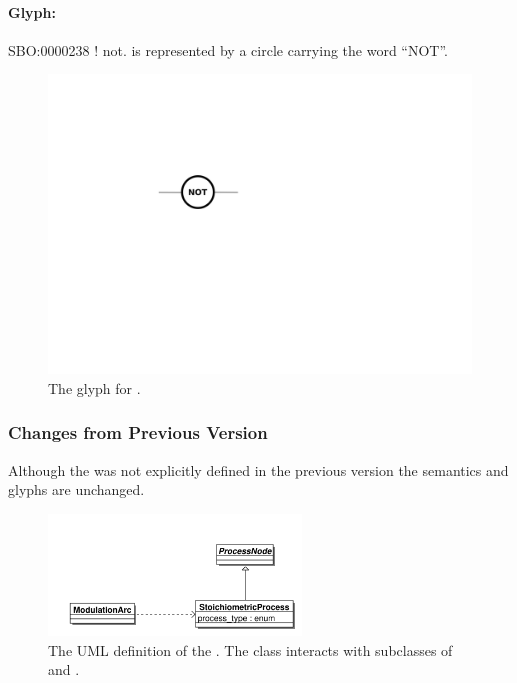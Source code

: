 \paragraph{Glyph: }\label{sec:techref:not}

\begin{glyphDescription}
 \glyphSboTerm SBO:0000238 ! not.
 \glyphNode {} is represented by a circle carrying the word ``NOT''.
 \end{glyphDescription}

\begin{figure}[htb]
  \centering
  \includegraphics[scale = 0.5]{images/not}
  \caption{The \PD glyph for .}
  \label{fig:techref:not}
\end{figure}

\subsubsection{Changes from Previous Version}

Although the  was not explicitly defined in
the previous version the semantics and glyphs are unchanged.


\label{defn:StoichiometricProcess}\label{sec:techref:stoichiometricprocess}

\begin{figure}[htb]
  \centering
  \includegraphics[width = 0.6\textwidth]{images/stoichprocessuml}
  \caption{The UML definition of the
    . The class interacts with
    subclasses of  and .}
  \label{fig:techref:stoichprocessuml}
\end{figure}

